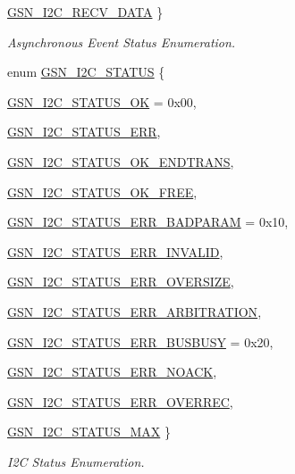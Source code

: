 \begin{DoxyCompactItemize}
\par
\hyperlink{a00649_gga409f34aceadb7ed6f56c6aac57ab4087aebd3adfb114070455555687da2e29407}{GSN\_\-I2C\_\-RECV\_\-DATA}
 \}
\begin{DoxyCompactList}\small\item\em Asynchronous Event Status Enumeration. \end{DoxyCompactList}\item 
enum \hyperlink{a00649_ga4d7ad53afa3985c8d48b6f0de5d44b77}{GSN\_\-I2C\_\-STATUS} \{ \par
\hyperlink{a00649_gga4d7ad53afa3985c8d48b6f0de5d44b77a394d60be3ef24c0b68cde373c2a0b0f7}{GSN\_\-I2C\_\-STATUS\_\-OK} =  0x00, 
\par
\hyperlink{a00649_gga4d7ad53afa3985c8d48b6f0de5d44b77a535e7016a121c42477d53500d70ff6a4}{GSN\_\-I2C\_\-STATUS\_\-ERR}, 
\par
\hyperlink{a00649_gga4d7ad53afa3985c8d48b6f0de5d44b77ae364f76eb03653a00da62b5d26c407ee}{GSN\_\-I2C\_\-STATUS\_\-OK\_\-ENDTRANS}, 
\par
\hyperlink{a00649_gga4d7ad53afa3985c8d48b6f0de5d44b77aa2d687f22b49218f273edcdf9e7db49d}{GSN\_\-I2C\_\-STATUS\_\-OK\_\-FREE}, 
\par
\hyperlink{a00649_gga4d7ad53afa3985c8d48b6f0de5d44b77a267496c8b5ec13ee41cd90e0f5ea3157}{GSN\_\-I2C\_\-STATUS\_\-ERR\_\-BADPARAM} =  0x10, 
\par
\hyperlink{a00649_gga4d7ad53afa3985c8d48b6f0de5d44b77ace72c07e90b446420671e15f1866def3}{GSN\_\-I2C\_\-STATUS\_\-ERR\_\-INVALID}, 
\par
\hyperlink{a00649_gga4d7ad53afa3985c8d48b6f0de5d44b77a08d58435d2a1675d4da7e0e3d9c3e1dd}{GSN\_\-I2C\_\-STATUS\_\-ERR\_\-OVERSIZE}, 
\par
\hyperlink{a00649_gga4d7ad53afa3985c8d48b6f0de5d44b77a4b1ace395705214697dc3fd9fa1057da}{GSN\_\-I2C\_\-STATUS\_\-ERR\_\-ARBITRATION}, 
\par
\hyperlink{a00649_gga4d7ad53afa3985c8d48b6f0de5d44b77a6879fe954ef376ed93ee3b953d6b0eed}{GSN\_\-I2C\_\-STATUS\_\-ERR\_\-BUSBUSY} =  0x20, 
\par
\hyperlink{a00649_gga4d7ad53afa3985c8d48b6f0de5d44b77acaa8a18ff4c4de5ae19b7bca268ac6cf}{GSN\_\-I2C\_\-STATUS\_\-ERR\_\-NOACK}, 
\par
\hyperlink{a00649_gga4d7ad53afa3985c8d48b6f0de5d44b77af278bd6be1a735e7fecec68716b123a3}{GSN\_\-I2C\_\-STATUS\_\-ERR\_\-OVERREC}, 
\par
\hyperlink{a00649_gga4d7ad53afa3985c8d48b6f0de5d44b77acb306db9784c6a1e65c1fd6cc849b656}{GSN\_\-I2C\_\-STATUS\_\-MAX}
 \}
\begin{DoxyCompactList}\small\item\em I2C Status Enumeration. \end{DoxyCompactList}\end{DoxyCompactItemize}
